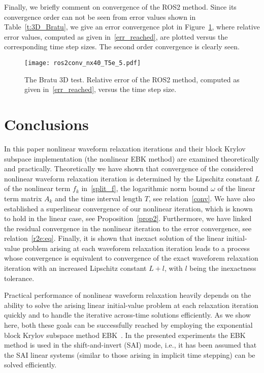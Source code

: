 \documentclass[sn-aps]{sn-jnl}
\theoremstyle{thmstyleone}%
\theoremstyle{thmstyletwo}%
\theoremstyle{thmstylethree}%
\begin{document}
Finally, we briefly comment on convergence of the ROS2 method.
Since its convergence order can not be seen from error values
shown in Table~\ref{t:3D_Bratu}, we give an error convergence plot 
in Figure~\ref{f:ros2conv}, where relative error values, computed
as given in~\eqref{err_reached}, are plotted versus the corresponding
time step sizes. The second order convergence is clearly
seen.

\begin{figure}
\centerline{\texttt{[image: ros2conv\_nx40\_T5e\_5.pdf]}}
\caption{The Bratu 3D test. 
Relative error of the ROS2 method, computed
as given in~\eqref{err_reached}, versus the time step size.}
\label{f:ros2conv}  
\end{figure}
 
\section{Conclusions}
\label{s:concl}

In this paper nonlinear waveform relaxation iterations and their block Krylov 
subspace implementation (the nonlinear EBK method)
are examined theoretically and practically.
Theoretically we have shown that convergence of the considered 
nonlinear waveform relaxation iteration
is determined by the Lipschitz constant $L$ of the nonlinear term $f_k$
in~\eqref{split_f}, the logarithmic norm bound $\omega$ of the linear term 
matrix $A_k$ and the time interval length $T$, see relation~\eqref{conv}.
We have also established a superlinear convergence of our nonlinear iteration, 
which is known to hold in the linear case, see Proposition~\ref{prop2}.
Furthermore, we have linked the residual convergence in the nonlinear
iteration to the error convergence, see relation~\eqref{r2e:eq}.
Finally, it is shown that inexact solution of 
the linear initial-value problem arising at each waveforem relaxation
iteration leads to a process whose convergence is equivalent to 
convergence of the exact waveforem relaxation iteration with an increased
Lipschitz constant $L+l$, with $l$ being the inexactness tolerance.   

Practical performance of nonlinear waveform relaxation heavily depends on
the ability to solve the arising linear initial-value problem at each 
relaxation iteration quickly and to handle the iterative across-time solutions
efficiently.  As we show here, both these goals can be successfully
reached by employing the exponential block Krylov subspace method
EBK~\cite{Botchev2013}.
In the presented experiments the EBK method is used in the shift-and-invert
(SAI) mode, i.e., it has been assumed that the SAI linear systems (similar to
those arising in implicit time stepping) can be solved efficiently.
\end{document}
